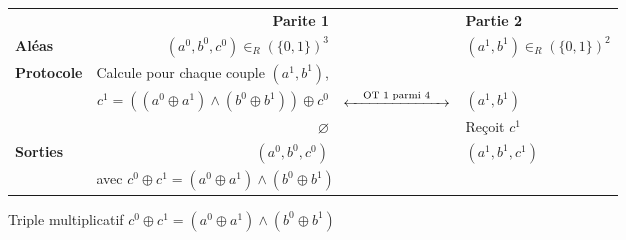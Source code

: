 \documentclass{article}
\begin{document}
\begin{figure}[h]
\centering
\begin{tabular}{|lrcl|}
\hline
 & \textbf{Parite 1} & & \textbf{Partie 2}\\
\textbf{Aléas} & $(a^0 , b^0 , c^0) \in_R(\{0, 1\})^3$ & & $(a^1 , b^1) \in_R(\{0, 1\})^2$\\
\textbf{Protocole} & Calcule pour chaque couple $(a^1, b^1)$, & & \\
 & $c^1 = ((a^0 \oplus a^1) \land (b^0 \oplus b^1)) \oplus c^0$ & $\xleftrightarrow{\hspace{1em} \text{OT 1 parmi 4} \hspace{1em}}$ & $(a^1, b^1)$ \\
 & $\varnothing$ & & Reçoit $c^1$ \\
\textbf{Sorties} & $(a^0 , b^0 , c^0)$ & & $(a^1 , b^1 , c^1)$ \\
 & \multicolumn{3}{l|}{avec $c^0 \oplus c^1 = (a^0 \oplus a^1) \land (b^0 \oplus b^1)$} \\
\hline
\end{tabular}
\captionsetup{labelformat=empty}
\caption{Triple multiplicatif $c^0 \oplus c^1 = (a^0 \oplus a^1) \land (b^0 \oplus b^1)$}
\end{figure}
\end{document}
